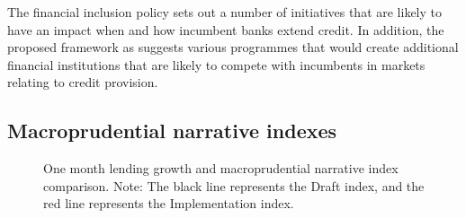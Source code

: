 \documentclass[
  letterpaper,
  DIV=11,
  numbers=noendperiod]{scrartcl}
\begin{document}
The financial inclusion policy sets out a number of initiatives that are
likely to have an impact when and how incumbent banks extend credit. In
addition, the proposed framework as suggests various programmes that
would create additional financial institutions that are likely to
compete with incumbents in markets relating to credit provision.

\subsection{Macroprudential narrative
indexes}\label{macroprudential-narrative-indexes}

\begin{figure}[H]


\caption{\label{fig-macro_narrative_indexes_one_month}One month lending
growth and macroprudential narrative index comparison. Note: The black
line represents the Draft index, and the red line represents the
Implementation index.}

\end{figure}%

\newpage
\end{document}
